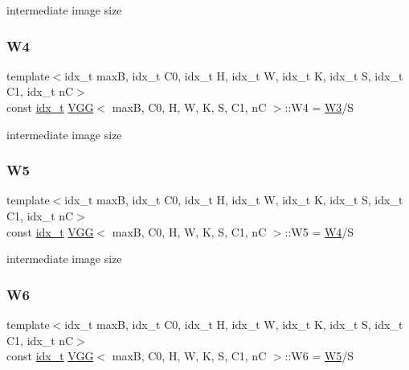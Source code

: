 intermediate image size \mbox{\label{structVGG_a9728cd3ccfa5011d2a795dff7e9abfe8}} 
\subsubsection{\texorpdfstring{W4}{W4}}
{\footnotesize\ttfamily template$<$idx\+\_\+t maxB, idx\+\_\+t C0, idx\+\_\+t H, idx\+\_\+t W, idx\+\_\+t K, idx\+\_\+t S, idx\+\_\+t C1, idx\+\_\+t nC$>$ \\
const \hyperlink{vgg__util_8h_a8e93478a00e685bea5e6a3f617bf03a3}{idx\+\_\+t} \hyperlink{structVGG}{V\+GG}$<$ maxB, C0, H, W, K, S, C1, nC $>$\+::W4 = \hyperlink{structVGG_ad3bde49e961175621e0937584dae0af0}{W3}/S\hspace{0.3cm}{\ttfamily [static]}}

intermediate image size \mbox{\label{structVGG_a01d04c8b89719716a0c45c3631765875}} 
\subsubsection{\texorpdfstring{W5}{W5}}
{\footnotesize\ttfamily template$<$idx\+\_\+t maxB, idx\+\_\+t C0, idx\+\_\+t H, idx\+\_\+t W, idx\+\_\+t K, idx\+\_\+t S, idx\+\_\+t C1, idx\+\_\+t nC$>$ \\
const \hyperlink{vgg__util_8h_a8e93478a00e685bea5e6a3f617bf03a3}{idx\+\_\+t} \hyperlink{structVGG}{V\+GG}$<$ maxB, C0, H, W, K, S, C1, nC $>$\+::W5 = \hyperlink{structVGG_a9728cd3ccfa5011d2a795dff7e9abfe8}{W4}/S\hspace{0.3cm}{\ttfamily [static]}}

intermediate image size \mbox{\label{structVGG_ada7bec62e12fac368b103ae3d8c59c0e}} 
\subsubsection{\texorpdfstring{W6}{W6}}
{\footnotesize\ttfamily template$<$idx\+\_\+t maxB, idx\+\_\+t C0, idx\+\_\+t H, idx\+\_\+t W, idx\+\_\+t K, idx\+\_\+t S, idx\+\_\+t C1, idx\+\_\+t nC$>$ \\
const \hyperlink{vgg__util_8h_a8e93478a00e685bea5e6a3f617bf03a3}{idx\+\_\+t} \hyperlink{structVGG}{V\+GG}$<$ maxB, C0, H, W, K, S, C1, nC $>$\+::W6 = \hyperlink{structVGG_a01d04c8b89719716a0c45c3631765875}{W5}/S\hspace{0.3cm}{\ttfamily [static]}}

